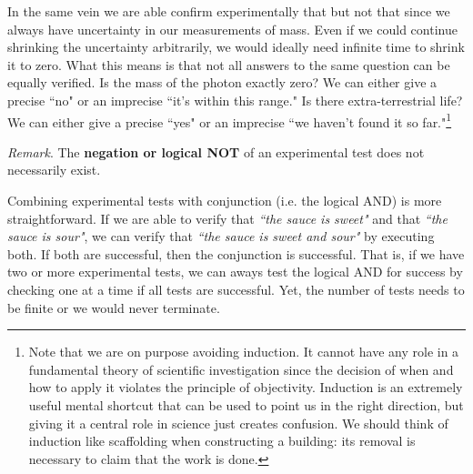 \documentclass[11pt,letterpaper,fleqn]{memoir} %
\begin{document}
In the same vein we are able confirm experimentally that  but not that  since we always have uncertainty in our measurements of mass. Even if we could continue shrinking the uncertainty arbitrarily, we would ideally need infinite time to shrink it to zero. What this means is that not all answers to the same question can be equally verified. Is the mass of the photon exactly zero? We can either give a precise ``no" or an imprecise ``it's within this range." Is there extra-terrestrial life? We can either give a precise ``yes" or an imprecise ``we haven't found it so far."\footnote{Note that we are on purpose avoiding induction. It cannot have any role in a fundamental theory of scientific investigation since the decision of when and how to apply it violates the principle of objectivity. Induction is an extremely useful mental shortcut that can be used to point us in the right direction, but giving it a central role in science just creates confusion. We should think of induction like scaffolding when constructing a building: its removal is necessary to claim that the work is done.}


\begin{mathSection}
	\emph{Remark}. The \textbf{negation or logical NOT} of an experimental test does not necessarily exist.
\end{mathSection}

Combining experimental tests with conjunction (i.e. the logical AND) is more straightforward. If we are able to verify that \emph{``the sauce is sweet"} and that \emph{``the sauce is sour"}, we can verify that \emph{``the sauce is sweet and sour"} by executing both. If both are successful, then the conjunction is successful. That is, if we have two or more experimental tests, we can aways test the logical AND for success by checking one at a time if all tests are successful. Yet, the number of tests needs to be finite or we would never terminate.
\end{document}
